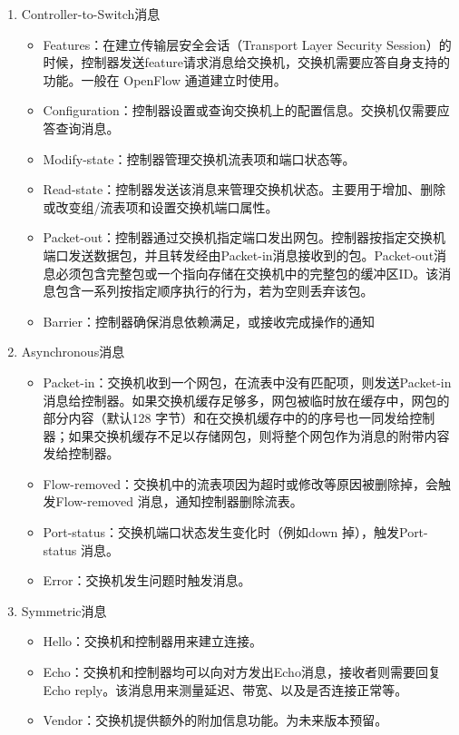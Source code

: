 \begin{enumerate}
\item Controller-to-Switch消息
\begin{itemize}
\item Features：在建立传输层安全会话（Transport Layer Security Session）的时候，控制器发送feature请求消息给交换机，交换机需要应答自身支持的功能。一般在 OpenFlow 通道建立时使用。
\item Configuration：控制器设置或查询交换机上的配置信息。交换机仅需要应答查询消息。
\item Modify-state：控制器管理交换机流表项和端口状态等。
\item Read-state：控制器发送该消息来管理交换机状态。主要用于增加、删除或改变组/流表项和设置交换机端口属性。
\item Packet-out：控制器通过交换机指定端口发出网包。控制器按指定交换机端口发送数据包，并且转发经由Packet-in消息接收到的包。Packet-out消息必须包含完整包或一个指向存储在交换机中的完整包的缓冲区ID。该消息包含一系列按指定顺序执行的行为，若为空则丢弃该包。 
\item Barrier：控制器确保消息依赖满足，或接收完成操作的通知
\end{itemize}
\item Asynchronous消息
\begin{itemize}
\item Packet-in：交换机收到一个网包，在流表中没有匹配项，则发送Packet-in 消息给控制器。如果交换机缓存足够多，网包被临时放在缓存中，网包的部分内容（默认128 字节）和在交换机缓存中的的序号也一同发给控制器；如果交换机缓存不足以存储网包，则将整个网包作为消息的附带内容发给控制器。
\item Flow-removed：交换机中的流表项因为超时或修改等原因被删除掉，会触发Flow-removed 消息，通知控制器删除流表。
\item Port-status：交换机端口状态发生变化时（例如down 掉），触发Port-status 消息。
\item Error：交换机发生问题时触发消息。
\end{itemize}
\item Symmetric消息
\begin{itemize}
\item Hello：交换机和控制器用来建立连接。
\item Echo：交换机和控制器均可以向对方发出Echo消息，接收者则需要回复Echo reply。该消息用来测量延迟、带宽、以及是否连接正常等。
\item Vendor：交换机提供额外的附加信息功能。为未来版本预留。
\end{itemize}
\end{enumerate}

